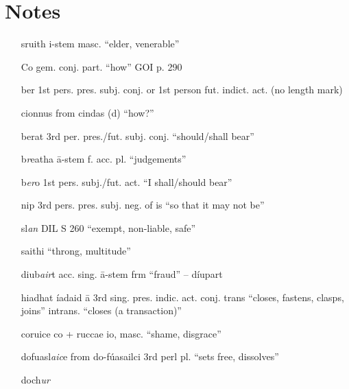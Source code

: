 \documentclass[11pt]{article}
\begin{document}
\section{Notes}

\begin{enumerate}
  \item[sruith] i-stem masc. \enquote{elder, venerable}

  \item[Co] gem. conj. part. \enquote{how} GOI p. 290

  \item[ber] 1st pers. pres. subj. conj. or 1st person fut. indict. act. (no length mark)

  \item[cionnus] from cindas (d) \enquote{how?}

  \item[berat] 3rd per. pres./fut. subj. conj. \enquote{should/shall bear}

  \item[b\emph{r}eatha] \={a}-stem f. acc. pl. \enquote{judgements}

  \item[b\emph{er}o] 1st pers. subj./fut. act. \enquote{I shall/should bear} 

  \item[nip] 3rd pers. pres. subj. neg. of is \enquote{so that it may not be}

  \item[sl\emph{an}] DIL S 260 \enquote{exempt, non-liable, safe}

  \item[saithi] \enquote{throng, multitude}

  \item[diub\emph{air}t] acc. sing. \={a}-stem frm \enquote{fraud} -- d\'{i}upart

  \item[hiadhat] \'{i}adaid \={a} 3rd sing. pres. indic. act. conj. trans \enquote{closes, fastens, clasps, joins} intrans. \enquote{closes (a transaction)}

  \item[coruice] co + ruccae io, masc. \enquote{shame, disgrace}

  \item[dofuasl\emph{aic}e] from do-f\'{u}asailci 3rd perl pl. \enquote{sets free, dissolves}

  \item[doch\emph{ur}]
\end{enumerate}
\end{document}
